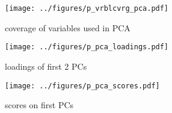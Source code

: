 \documentclass[12pt]{article}
\begin{document}
\begin{figure}[htbp]
\centering
\texttt{[image: ../figures/p\_vrblcvrg\_pca.pdf]}
\caption{\label{fig:p_vrblcvrg_pca}coverage of variables used in PCA}
\end{figure}

\begin{figure}[htbp]
\centering
\texttt{[image: ../figures/p\_pca\_loadings.pdf]}
\caption{\label{fig:p_pca_loadings}loadings of first 2 PCs}
\end{figure}

\begin{figure}[htbp]
\centering
\texttt{[image: ../figures/p\_pca\_scores.pdf]}
\caption{\label{fig:p_pca_scores}scores on first PCs}
\end{figure}

\end{document}
